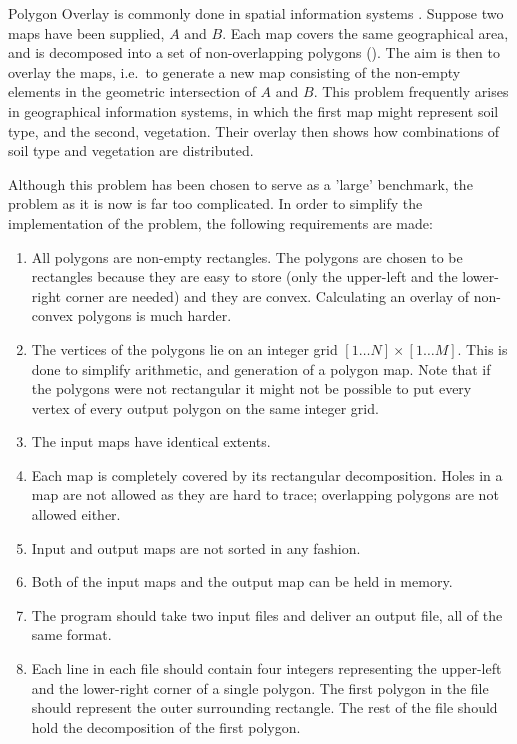 
Polygon Overlay is commonly done in spatial information systems
\cite{White:1978}.
Suppose two maps have been supplied,
$A$ and $B$.
Each map covers the same geographical area,
and is decomposed into a set of non-overlapping polygons
().
The aim is then to overlay the maps,
i.e.\ to generate a new map consisting of
the non-empty elements in the geometric intersection of $A$
and $B$.
This problem frequently arises in geographical information
systems,
in which the first map might represent soil type,
and the second,
vegetation.
Their overlay then shows how combinations of soil type and
vegetation
are distributed.

\begin{figure}[hbtp]
  \begin{centering}
    \hspace{0cm}
  \end{centering}
\end{figure}

Although this problem has been chosen to serve as a 'large' benchmark,
the problem as it is now is far too complicated.
In order to simplify the implementation of the problem,
the following requirements are made:
\begin{enumerate}
  \item
    All polygons are non-empty rectangles.
    The polygons are chosen to be rectangles because
    they are easy to store
    (only the upper-left and the lower-right corner are needed)
    and they are convex.
    Calculating an overlay of non-convex polygons is much
    harder.
  \item
    The vertices of the polygons lie on an integer grid
    $[1{\ldots}N] {\times} [1{\ldots}M]$.
    This is done to simplify arithmetic,
    and generation of a polygon map.
    Note that if the polygons were not rectangular it might
    not be possible to put every vertex of every output
    polygon on the same integer grid.
  \item
    The input maps have identical extents.
  \item
    Each map is completely covered by its rectangular
    decomposition.
    Holes in a map are not allowed as they are hard to trace;
    overlapping polygons are not allowed either.
  \item
    Input and output maps are not sorted in any fashion.
  \item
    Both of the input maps and the output map can be held
    in memory. 
  \item
    The program should take two input files and deliver an
    output file, all of the same format.
  \item
    Each line in each file should contain four integers
    representing the upper-left and the lower-right corner of
    a single polygon.
    The first polygon in the file should represent the outer
    surrounding rectangle.
    The rest of the file should hold the decomposition of the
    first polygon.
\end{enumerate}


